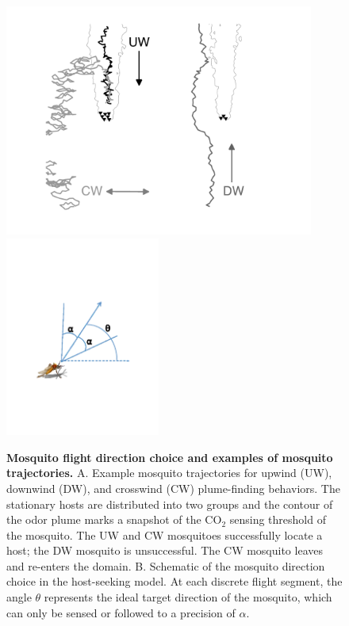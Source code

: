 \documentclass[10pt]{article}
\begin{document}
\begin{figure}[!htp]
\includegraphics[width=4in]{revised2figs/Figure2A} 	
\includegraphics[width=2in]{revised2figs/Figure2B}
\caption{
{\bf Mosquito flight direction choice and examples of mosquito trajectories. } A. Example mosquito trajectories for upwind (UW), downwind (DW), and crosswind (CW) plume-finding behaviors. The stationary hosts are distributed into two groups and the contour of the odor plume marks a snapshot of the CO$_2$ sensing threshold of the mosquito. The UW and CW mosquitoes successfully locate a host; the DW mosquito is unsuccessful. The CW mosquito leaves and re-enters the domain. B. Schematic of the mosquito direction choice in the host-seeking model. At each discrete flight segment, the angle $\theta$ represents the ideal target direction of the mosquito, which can only be sensed or followed to a precision of $\alpha$.
}

\label{MosquitoGradient}
\end{figure}
\end{document}
